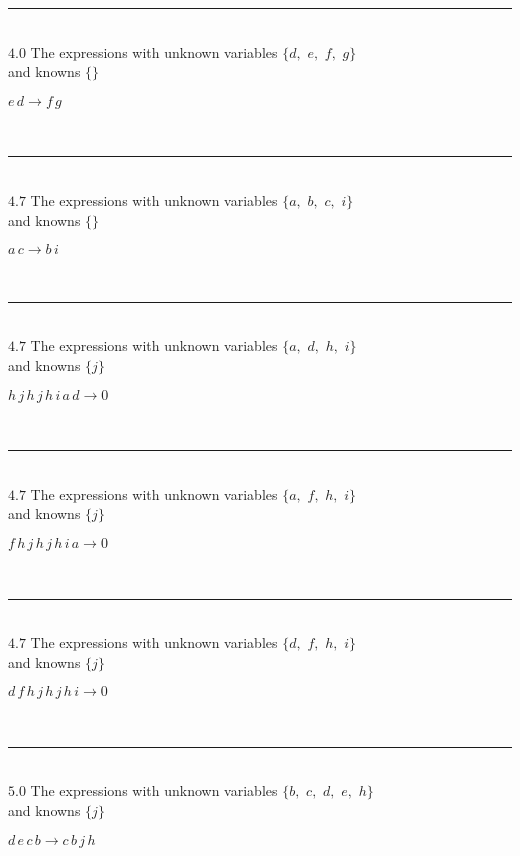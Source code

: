 \documentclass[rep10,leqno]{report}
\begin{document}
\rule[3pt]{6in}{.7pt}\\
$4.0$  The expressions with unknown variables $\{d,
$ $
e,
$ $
f,
$ $
g\}$\\
and knowns $\{\}$\smallskip\\
\begin{minipage}{6in}
$
e\,
 d\rightarrow f\,
 g
$
\end{minipage}\\
\rule[3pt]{6in}{.7pt}\\
$4.7$  The expressions with unknown variables $\{a,
$ $
b,
$ $
c,
$ $
i\}$\\
and knowns $\{\}$\smallskip\\
\begin{minipage}{6in}
$
a\,
 c\rightarrow b\,
 i
$
\end{minipage}\\
\rule[3pt]{6in}{.7pt}\\
$4.7$  The expressions with unknown variables $\{a,
$ $
d,
$ $
h,
$ $
i\}$\\
and knowns $\{j\}$\smallskip\\
\begin{minipage}{6in}
$
h\,
 j\,
 h\,
 j\,
 h\,
 i\,
 a\,
 d\rightarrow 0
$
\end{minipage}\\
\rule[3pt]{6in}{.7pt}\\
$4.7$  The expressions with unknown variables $\{a,
$ $
f,
$ $
h,
$ $
i\}$\\
and knowns $\{j\}$\smallskip\\
\begin{minipage}{6in}
$
f\,
 h\,
 j\,
 h\,
 j\,
 h\,
 i\,
 a\rightarrow 0
$
\end{minipage}\\
\rule[3pt]{6in}{.7pt}\\
$4.7$  The expressions with unknown variables $\{d,
$ $
f,
$ $
h,
$ $
i\}$\\
and knowns $\{j\}$\smallskip\\
\begin{minipage}{6in}
$
d\,
 f\,
 h\,
 j\,
 h\,
 j\,
 h\,
 i\rightarrow 0
$
\end{minipage}\\
\rule[3pt]{6in}{.7pt}\\
$5.0$  The expressions with unknown variables $\{b,
$ $
c,
$ $
d,
$ $
e,
$ $
h\}$\\
and knowns $\{j\}$\smallskip\\
\begin{minipage}{6in}
$
d\,
 e\,
 c\,
 b\rightarrow c\,
 b\,
 j\,
 h
$
\end{minipage}\\
\end{document}
